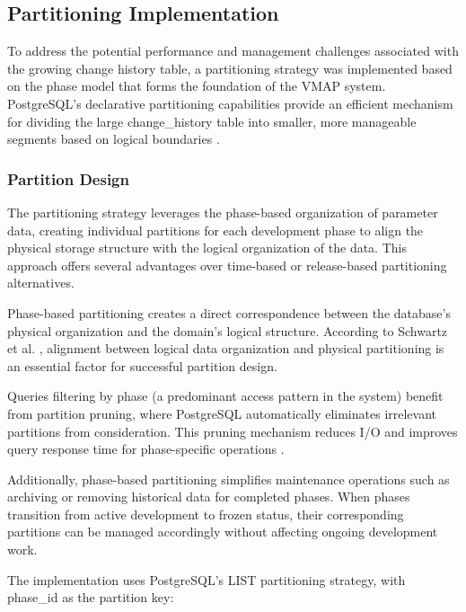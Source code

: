 \subsection{Partitioning Implementation}
\label{subsec:partitioning-implementation}

To address the potential performance and management challenges associated with the growing change history table, a partitioning strategy was implemented based on the phase model that forms the foundation of the \ac{VMAP} system. PostgreSQL's declarative partitioning capabilities provide an efficient mechanism for dividing the large change\_history table into smaller, more manageable segments based on logical boundaries \cite{obe2017postgresql}.

\subsubsection{Partition Design}
\label{subsubsec:partition-design}

The partitioning strategy leverages the phase-based organization of parameter data, creating individual partitions for each development phase to align the physical storage structure with the logical organization of the data. This approach offers several advantages over time-based or release-based partitioning alternatives.

Phase-based partitioning creates a direct correspondence between the database's physical organization and the domain's logical structure. According to Schwartz et al. \cite{schwartz2012high}, alignment between logical data organization and physical partitioning is an essential factor for successful partition design.

Queries filtering by phase (a predominant access pattern in the system) benefit from partition pruning, where PostgreSQL automatically eliminates irrelevant partitions from consideration. This pruning mechanism reduces I/O and improves query response time for phase-specific operations \cite{obe2017postgresql}.

Additionally, phase-based partitioning simplifies maintenance operations such as archiving or removing historical data for completed phases. When phases transition from active development to frozen status, their corresponding partitions can be managed accordingly without affecting ongoing development work.

The implementation uses PostgreSQL's LIST partitioning strategy, with phase\_id as the partition key:

